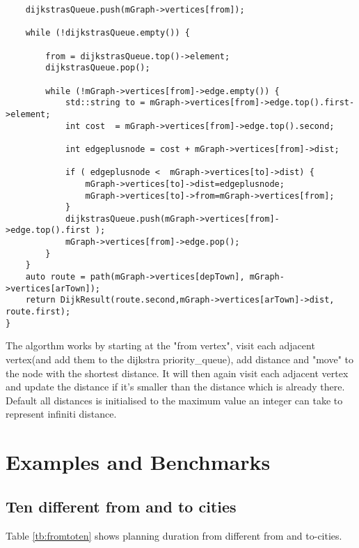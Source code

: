 \begin{lslisting}
\begin{lstlisting}
	dijkstrasQueue.push(mGraph->vertices[from]);

	while (!dijkstrasQueue.empty()) {

		from = dijkstrasQueue.top()->element;
		dijkstrasQueue.pop();

		while (!mGraph->vertices[from]->edge.empty()) {
			std::string to = mGraph->vertices[from]->edge.top().first->element;
			int cost  = mGraph->vertices[from]->edge.top().second;

			int edgeplusnode = cost + mGraph->vertices[from]->dist;

			if ( edgeplusnode <  mGraph->vertices[to]->dist) {
				mGraph->vertices[to]->dist=edgeplusnode;
				mGraph->vertices[to]->from=mGraph->vertices[from];
			}
			dijkstrasQueue.push(mGraph->vertices[from]->edge.top().first );
			mGraph->vertices[from]->edge.pop();
		}
	}
	auto route = path(mGraph->vertices[depTown], mGraph->vertices[arTown]);
	return DijkResult(route.second,mGraph->vertices[arTown]->dist, route.first);
}
\end{lstlisting}

The algorthm works by starting at the "from vertex", visit each adjacent vertex(and add them to the dijkstra priority\_queue), add distance and "move" to the node with the shortest distance. 
It will then again visit each adjacent vertex and update the distance if it's smaller than the distance which is already there.
Default all distances is initialised to the maximum value an integer can take to represent infiniti distance.



\section{Examples and Benchmarks}
\subsection{Ten different from and to cities}
Table \ref{tb:fromtoten} shows planning duration from different from and to-cities.


\end{lslisting}
